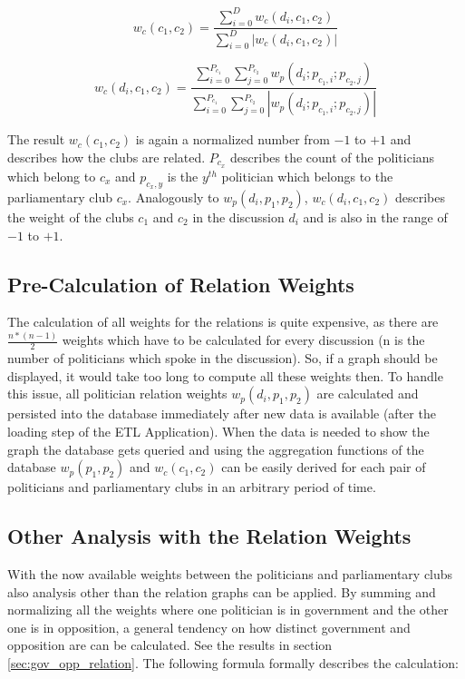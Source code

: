$$
w_c(c_1,c_2) = \frac{\displaystyle\sum_{i=0}^{D} w_c(d_i,c_1,c_2)}{\displaystyle\sum_{i=0}^{D} |w_c(d_i,c_1,c_2)|}
$$

$$
w_c(d_i,c_1,c_2) = \frac{\displaystyle\sum_{i=0}^{P_{c_1}} \displaystyle\sum_{j=0}^{P_{c_2}} w_p(d_i;p_{c_1,i};p_{c_2,j})}{\displaystyle\sum_{i=0}^{P_{c_1}} \displaystyle\sum_{j=0}^{P_{c_2}} |w_p(d_i;p_{c_1,i};p_{c_2,j})|}
$$

The result $w_c(c_1,c_2)$ is again a normalized number from $-1$ to $+1$ and describes how the clubs are related. $P_{c_x}$ describes the count of the politicians which belong to $c_x$ and $p_{c_x,y}$ is the $y^{th}$ politician which belongs to the parliamentary club $c_x$. Analogously to $w_p(d_i,p_1,p_2)$, $w_c(d_i,c_1,c_2)$ describes the weight of the clubs $c_1$ and $c_2$ in the discussion $d_i$ and is also in the range of $-1$ to $+1$.

\subsection{Pre-Calculation of Relation Weights}
The calculation of all weights for the relations is quite expensive, as there are $\frac{n * (n - 1)}{2}$ weights which have to be calculated for every discussion (n is the number of politicians which spoke in the discussion). So, if a graph should be displayed, it would take too long to compute all these weights then. To handle this issue, all politician relation weights $w_p(d_i,p_1,p_2)$ are calculated and persisted into the database immediately after new data is available (after the loading step of the ETL Application). When the data is needed to show the graph the database gets queried and using the aggregation functions of the database $w_p(p_1,p_2)$ and $w_c(c_1,c_2)$ can be easily derived for each pair of politicians and parliamentary clubs in an arbitrary period of time.

\subsection{Other Analysis with the Relation Weights}
With the now available weights between the politicians and parliamentary clubs also analysis other than the relation graphs can be applied. By summing and normalizing all the weights where one politician is in government and the other one is in opposition, a general tendency on how distinct government and opposition are can be calculated. See the results in section \ref{sec:gov_opp_relation}. The following formula formally describes the calculation:

